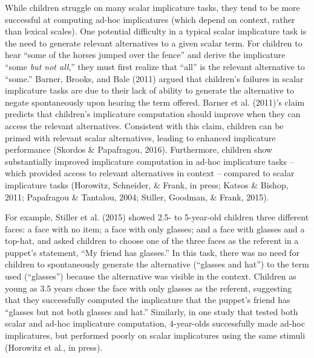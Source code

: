\documentclass[mask,man]{apa6}
\theoremstyle{definition}
\theoremstyle{definition}
\theoremstyle{definition}
\theoremstyle{remark}
\begin{document}
While children struggle on many scalar implicature tasks, they tend to
be more successful at computing ad-hoc implicatures (which depend on
context, rather than lexical scales). One potential difficulty in a
typical scalar implicature task is the need to generate relevant
alternatives to a given scalar term. For children to hear \enquote{some
of the horses jumped over the fence} and derive the implicature
\enquote{some \emph{but not all},} they must first realize that
\enquote{all} is the relevant alternative to \enquote{some.} Barner,
Brooks, and Bale (2011) argued that children's failures in scalar
implicature tasks are due to their lack of ability to generate the
alternative to negate spontaneously upon hearing the term offered.
Barner et al. (2011)'s claim predicts that children's implicature
computation should improve when they can access the relevant
alternatives. Consistent with this claim, children can be primed with
relevant scalar alternatives, leading to enhanced implicature
performance (Skordos \& Papafragou, 2016). Furthermore, children show
substantially improved implicature computation in ad-hoc implicature
tasks -- which provided access to relevant alternatives in context --
compared to scalar implicature tasks (Horowitz, Schneider, \& Frank, in
press; Katsos \& Bishop, 2011; Papafragou \& Tantalou, 2004; Stiller,
Goodman, \& Frank, 2015).

For example, Stiller et al. (2015) showed 2.5- to 5-year-old children
three different faces: a face with no item; a face with only glasses;
and a face with glasses and a top-hat, and asked children to choose one
of the three faces as the referent in a puppet's statement, \enquote{My
friend has glasses.} In this task, there was no need for children to
spontaneously generate the alternative (\enquote{glasses and hat}) to
the term used (\enquote{glasses}) because the alternative was visible in
the context. Children as young as 3.5 years chose the face with only
glasses as the referent, suggesting that they successfully computed the
implicature that the puppet's friend has \enquote{glasses but not both
glasses and hat.} Similarly, in one study that tested both scalar and
ad-hoc implicature computation, 4-year-olds successfully made ad-hoc
implicatures, but performed poorly on scalar implicatures using the same
stimuli (Horowitz et al., in press).
\end{document}
